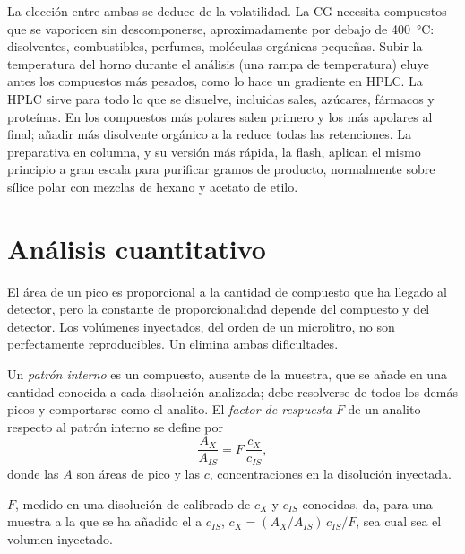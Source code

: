 La elección entre ambas se deduce de la volatilidad. La CG necesita compuestos que se vaporicen sin descomponerse,
aproximadamente por debajo de \qty{400}{\degreeCelsius}: disolventes, combustibles, perfumes, moléculas orgánicas pequeñas. Subir
la temperatura del horno durante el análisis (una rampa de temperatura) eluye antes los compuestos más pesados, como lo hace un gradiente
en HPLC. La HPLC sirve para todo lo que se disuelve, incluidas sales, azúcares, fármacos y proteínas. En
 los compuestos más polares salen primero y los más apolares al final; añadir más disolvente
orgánico a la  reduce todas las retenciones. La  preparativa en columna, y su versión
más rápida, la  flash, aplican el mismo principio a gran escala para purificar gramos de producto,
normalmente sobre sílice polar con mezclas de hexano y acetato de etilo.

\section{Análisis cuantitativo}

El área de un pico es proporcional a la cantidad de compuesto que ha llegado al detector, pero la
constante de proporcionalidad depende del compuesto y del detector. Los volúmenes inyectados, del orden de
un microlitro, no son perfectamente reproducibles. Un  elimina ambas dificultades.

\begin{definition}\label{def:b2:chromatography:quantitative}
Un \emph{patrón interno} es un compuesto, ausente de la muestra, que se añade en una
cantidad conocida a cada disolución analizada; debe resolverse de todos los demás picos y comportarse como el
analito. El \emph{factor de respuesta} $F$ de un analito respecto al patrón
interno se define por
\begin{equation*}
\frac{A_X}{A_{IS}} = F\,\frac{c_X}{c_{IS}},
\end{equation*}
donde las $A$ son áreas de pico y las $c$, concentraciones en la disolución inyectada.
\end{definition}

\begin{proposition}\label{prop:b2:chromatography:internal-standard}
$F$, medido en una disolución de calibrado de $c_X$ y $c_{IS}$ conocidas, da, para una muestra a la que se ha añadido el
 a $c_{IS}$, $c_X = (A_X/A_{IS})\,c_{IS}/F$, sea cual sea el volumen inyectado.
\end{proposition}

